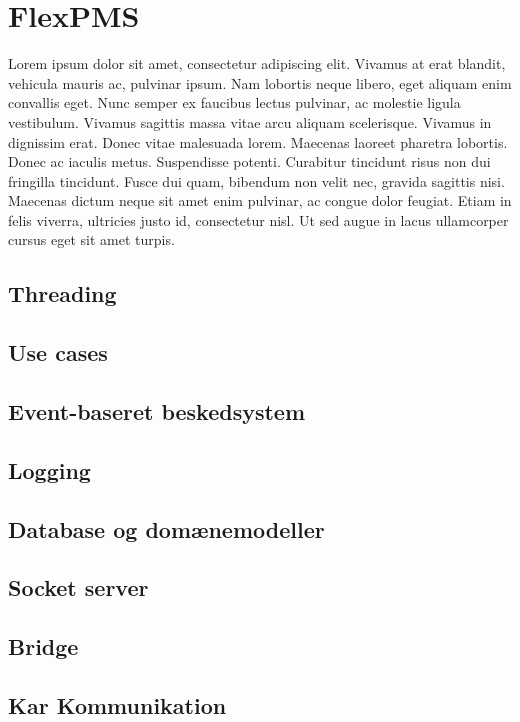 \section{FlexPMS}
Lorem ipsum dolor sit amet, consectetur adipiscing elit. Vivamus at erat blandit, vehicula mauris ac, pulvinar ipsum. Nam lobortis neque libero, eget aliquam enim convallis eget. Nunc semper ex faucibus lectus pulvinar, ac molestie ligula vestibulum. Vivamus sagittis massa vitae arcu aliquam scelerisque. Vivamus in dignissim erat. Donec vitae malesuada lorem. Maecenas laoreet pharetra lobortis. Donec ac iaculis metus. Suspendisse potenti. Curabitur tincidunt risus non dui fringilla tincidunt. Fusce dui quam, bibendum non velit nec, gravida sagittis nisi. Maecenas dictum neque sit amet enim pulvinar, ac congue dolor feugiat. Etiam in felis viverra, ultricies justo id, consectetur nisl. Ut sed augue in lacus ullamcorper cursus eget sit amet turpis.\\


\subsection{Threading}


\subsection{Use cases}


\subsection{Event-baseret beskedsystem}


\subsection{Logging}


\subsection{Database og domænemodeller}


\subsection{Socket server}


\subsection{Bridge}


\subsection{Kar Kommunikation}

